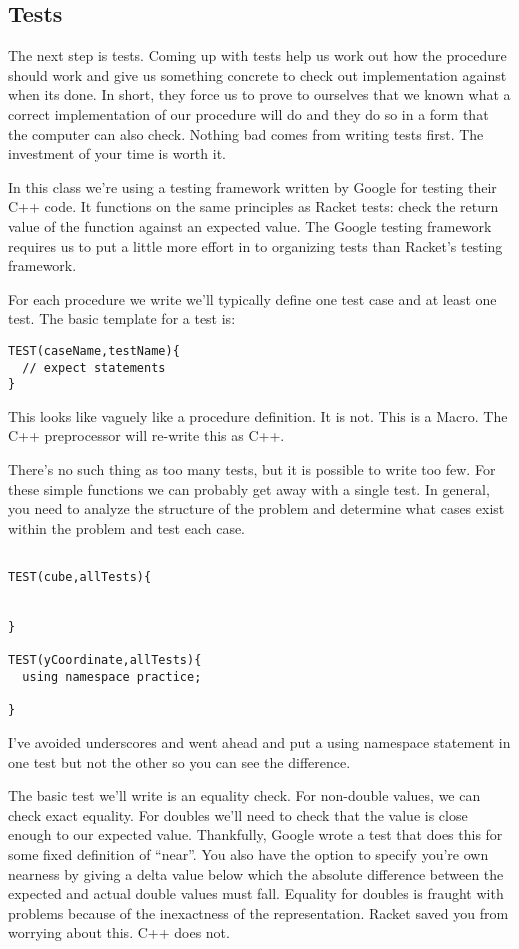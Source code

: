 \documentclass[]{tufte-handout}
\begin{document}
\subsection{Tests}

The next step is tests. Coming up with tests help us work out how the procedure should work and give us something concrete to check out implementation against when its done. In short, they force us to prove to ourselves that we known what a correct implementation of our procedure will do and they do so in a form that the computer can also check. Nothing bad comes from writing tests first. The investment of your time is worth it.    

In this class we're using a testing framework written by Google for testing their C++ code. It functions on the same principles as Racket tests: check the return value of the function against an expected value. The Google testing framework requires us to put a little more effort in to organizing tests than Racket's testing framework. 

For each procedure we write we'll typically define one test case and at least one test. The basic template for a test is:
\begin{verbatim}
TEST(caseName,testName){
  // expect statements
}
\end{verbatim} 
This looks like vaguely like a procedure definition. It is not. This is a Macro. The C++ preprocessor will re-write this as C++.


There's no such thing as too many tests, but it is possible to write too few. For these simple functions we can probably get away with a single test. In general, you need to analyze the structure of the problem and determine what cases exist within the problem and test each case. 
\begin{verbatim}

TEST(cube,allTests){


}

TEST(yCoordinate,allTests){
  using namespace practice;

}
\end{verbatim}
I've avoided underscores and went ahead and put a using namespace statement in one test but not the other so you can see the difference.


The basic test we'll write is an equality check. For non-double values, we can check exact equality. For doubles we'll need to check that the value is close enough to our expected value. Thankfully, Google wrote a test that does this for some fixed definition of ``near''. You also have the option to specify you're own nearness by giving a delta value below which the absolute difference between the expected and actual double values must fall. Equality for doubles is fraught with problems because of the inexactness of the representation. Racket saved you from worrying about this. C++ does not. 
\end{document}
